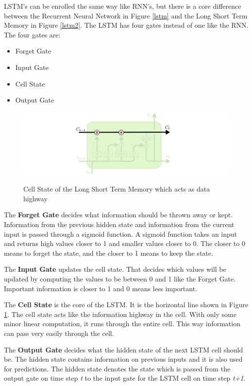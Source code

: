 LSTM's can be enrolled the same way like RNN's, but there is a core difference between the Recurrent Neural Network in Figure \ref{lstm} and the Long Short Term Memory in Figure \ref{lstm2}. The LSTM has four gates instead of one like the RNN. The four gates are:

\begin{itemize}		
	\item Forget Gate
	\item Input Gate
	\item Cell State
	\item Output Gate
\end{itemize}

\begin{figure}
	\begin{center}
		\includegraphics[width=4.5in]{photos/LSTM3-C-line}\\
		\caption{Cell State of the Long Short Term Memory which acts as data highway \cite{olah}}\label{lstm3}
	\end{center}
\end{figure}

The \textbf{Forget Gate} decides what information should be thrown away or kept. Information from the previous hidden state and information from the current input is passed through a sigmoid function. A sigmoid function takes an input and returns high values closer to 1 and smaller values closer to 0. The closer to 0 means to forget the state, and the closer to 1 means to keep the state.

The \textbf{Input Gate} updates the cell state. That decides which values will be updated by computing the values to be between 0 and 1 like the Forget Gate. Important information is closer to 1 and 0 means less important.

The \textbf{Cell State} is the core of the LSTM. It is the horizontal line shown in Figure \ref{lstm3}. The cell state acts like the information highway in the cell. With only some minor linear computation, it runs through the entire cell. This way information can pass very easily through the cell. 

The \textbf{Output Gate} decides what the hidden state of the next LSTM cell should be. The hidden state contains information on previous inputs and it is also used for predictions. The hidden state denotes the state which is passed from the output gate on time step \textit{t} to the input gate for the LSTM cell on time step \textit{t+1}.


